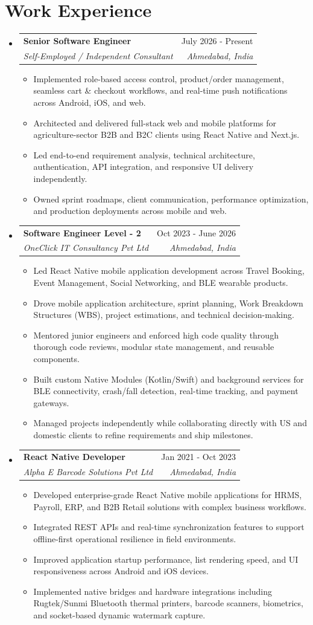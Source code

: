 \documentclass[letterpaper,10.5pt]{article}
\makeatletter
\newcommand{\resumeItem}[1]{
  \item\small{
    {#1 \vspace{-2pt}}
  }
}
\newcommand{\resumeSubheading}[4]{
  \vspace{-1pt}\item
    \begin{tabular*}{0.99\textwidth}[t]{l@{\extracolsep{\fill}}r}
      \textbf{#1} & \small #2 \\
      \textit{\small#3} & \textit{\small #4} \\
    \end{tabular*}\vspace{-6pt}
}
\newcommand{\resumeSubHeadingListStart}{\begin{itemize}[leftmargin=0.0in, label={}]}
\newcommand{\resumeSubHeadingListEnd}{\end{itemize}}
\newcommand{\resumeItemListStart}{\begin{itemize}[leftmargin=0.16in]}
\newcommand{\resumeItemListEnd}{\end{itemize}\vspace{-4pt}}
\makeatother
\begin{document}
\section{Work Experience}
\resumeSubHeadingListStart
\resumeSubheading
  {Senior Software Engineer}{July 2026 - Present}
  {Self-Employed / Independent Consultant}{Ahmedabad, India}
  \resumeItemListStart
    \resumeItem{Implemented role-based access control, product/order management, seamless cart \& checkout workflows, and real-time push notifications across Android, iOS, and web.}
    \resumeItem{Architected and delivered full-stack web and mobile platforms for agriculture-sector B2B and B2C clients using React Native and Next.js.}
    \resumeItem{Led end-to-end requirement analysis, technical architecture, authentication, API integration, and responsive UI delivery independently.}
    \resumeItem{Owned sprint roadmaps, client communication, performance optimization, and production deployments across mobile and web.}
  \resumeItemListEnd

\resumeSubheading
  {Software Engineer Level - 2}{Oct 2023 - June 2026}
  {OneClick IT Consultancy Pvt Ltd}{Ahmedabad, India}
  \resumeItemListStart
    \resumeItem{Led React Native mobile application development across Travel Booking, Event Management, Social Networking, and BLE wearable products.}
    \resumeItem{Drove mobile application architecture, sprint planning, Work Breakdown Structures (WBS), project estimations, and technical decision-making.}
    \resumeItem{Mentored junior engineers and enforced high code quality through thorough code reviews, modular state management, and reusable components.}
    \resumeItem{Built custom Native Modules (Kotlin/Swift) and background services for BLE connectivity, crash/fall detection, real-time tracking, and payment gateways.}
    \resumeItem{Managed projects independently while collaborating directly with US and domestic clients to refine requirements and ship milestones.}
  \resumeItemListEnd

\resumeSubheading
  {React Native Developer}{Jan 2021 - Oct 2023}
  {Alpha E Barcode Solutions Pvt Ltd}{Ahmedabad, India}
  \resumeItemListStart
    \resumeItem{Developed enterprise-grade React Native mobile applications for HRMS, Payroll, ERP, and B2B Retail solutions with complex business workflows.}
    \resumeItem{Integrated REST APIs and real-time synchronization features to support offline-first operational resilience in field environments.}
    \resumeItem{Improved application startup performance, list rendering speed, and UI responsiveness across Android and iOS devices.}
    \resumeItem{Implemented native bridges and hardware integrations including Rugtek/Sunmi Bluetooth thermal printers, barcode scanners, biometrics, and socket-based dynamic watermark capture.}
  \resumeItemListEnd
\resumeSubHeadingListEnd
\vspace{-6pt}
\end{document}
